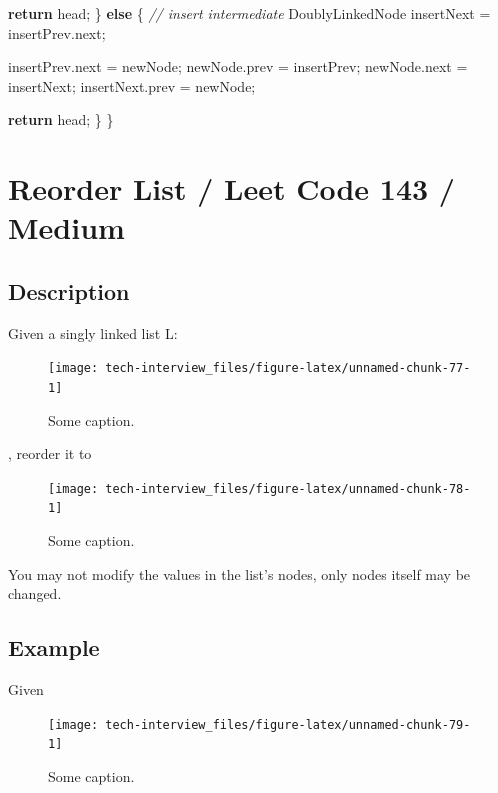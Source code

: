 \documentclass[]{book}
\newenvironment{Shaded}{\begin{snugshade}}{\end{snugshade}}
\newcommand{\CommentTok}[1]{\textcolor[rgb]{0.56,0.35,0.01}{\textit{#1}}}
\newcommand{\FunctionTok}[1]{\textcolor[rgb]{0.00,0.00,0.00}{#1}}
\newcommand{\KeywordTok}[1]{\textcolor[rgb]{0.13,0.29,0.53}{\textbf{#1}}}
\newcommand{\NormalTok}[1]{#1}
\begin{document}
\begin{Shaded}
\begin{Highlighting}[]
        \KeywordTok{return}\NormalTok{ head;}
\NormalTok{    \} }\KeywordTok{else}\NormalTok{ \{}
        \CommentTok{// insert intermediate}
\NormalTok{        DoublyLinkedNode insertNext = insertPrev.}\FunctionTok{next}\NormalTok{;}

\NormalTok{        insertPrev.}\FunctionTok{next}\NormalTok{ = newNode;}
\NormalTok{        newNode.}\FunctionTok{prev}\NormalTok{ = insertPrev;}
\NormalTok{        newNode.}\FunctionTok{next}\NormalTok{ = insertNext;}
\NormalTok{        insertNext.}\FunctionTok{prev}\NormalTok{ = newNode;}

        \KeywordTok{return}\NormalTok{ head;}
\NormalTok{    \}}
\NormalTok{\}}
\end{Highlighting}
\end{Shaded}

\hypertarget{reorder-list-leet-code-143-medium}{%
\section{Reorder List / Leet Code 143 / Medium}\label{reorder-list-leet-code-143-medium}}

\hypertarget{description-99}{%
\subsection{Description}\label{description-99}}

Given a singly linked list L:

\begin{figure}
\texttt{[image: tech-interview\_files/figure-latex/unnamed-chunk-77-1]} \caption{Some caption.}\label{fig:unnamed-chunk-77}
\end{figure}

, reorder it to

\begin{figure}
\texttt{[image: tech-interview\_files/figure-latex/unnamed-chunk-78-1]} \caption{Some caption.}\label{fig:unnamed-chunk-78}
\end{figure}

You may not modify the values in the list's nodes, only nodes itself may be changed.

\hypertarget{example-95}{%
\subsection{Example}\label{example-95}}

Given

\begin{figure}
\texttt{[image: tech-interview\_files/figure-latex/unnamed-chunk-79-1]} \caption{Some caption.}\label{fig:unnamed-chunk-79}
\end{figure}
\end{document}
